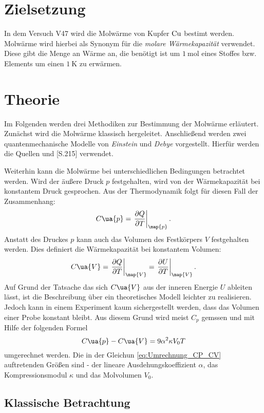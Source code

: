 \setcounter{page}{1}
\section*{Zielsetzung}
In dem Versuch V47 wird die Molwärme von Kupfer $\ce{Cu}$ bestimt werden.
Molwärme wird hierbei als Synonym für die \emph{molare Wärmekapazität} verwendet.
Diese gibt die Menge an Wärme an, die benötigt ist um $\SI{1}{\mol}$ eines Stoffes
bzw. Elements um einen $\SI{1}{\kelvin}$ zu erwärmen.

\section{Theorie}
Im Folgenden werden drei Methodiken zur Bestimmung der Molwärme erläutert.
Zunächst wird die Molwärme klassisch hergeleitet. Anschließend werden zwei
quantenmechanische Modelle von \emph{Einstein} und \emph{Debye}
vorgestellt. Hierfür werden die Quellen \cite{} und \cite{}[S.215] verwendet.

Weiterhin kann die Molwärme bei unterschiedlichen Bedingungen betrachtet werden.
Wird der äußere Druck $p$ festgehalten, wird von der Wärmekapazität bei konstantem
Druck gesprochen. Aus der Thermodynamik folgt für diesen Fall der Zusammenhang:
\begin{equation}
  \label{eq:C_P}
  C\ua{p} = \left.\frac{\partial Q}{\partial T}\right|_{\map{p}}.
\end{equation}
Anstatt des Druckes $p$ kann auch das Volumen des Festkörpers $V$ festgehalten
werden. Dies definiert die Wärmekapazität bei konstantem Volumen:
\begin{equation}
  \label{eq:C_V}
  C\ua{V} = \left.\frac{\partial Q}{\partial T}\right|_{\map{V}} = \left. \frac{\partial U}{\partial T}\right|_{\map{V}}.
\end{equation}
Auf Grund der Tatsache das sich $C\ua{V}$ aus der inneren Energie $U$ ableiten
lässt, ist die Beschreibung über ein theoretisches Modell leichter zu realisieren.
Jedoch kann in einem Experiment kaum sichergestellt werden, dass das Volumen einer
Probe konstant bleibt. Aus diesem Grund wird meist $C_p$ gemssen und mit Hilfe
der folgenden Formel
\begin{equation}
  \label{eq:Umrechnung_CP_CV}
  C\ua{p} - C\ua{V} = 9\alpha^2 \kappa V_0 T
\end{equation}
umgerechnet werden. Die in der Gleichun \eqref{eq:Umrechnung_CP_CV} auftretenden
Größen sind - der lineare Ausdehungskoeffizient $\alpha$, das Kompressionsmodul
$\kappa$ und das Molvolumen $V_0$.
\subsection{Klassische Betrachtung}
